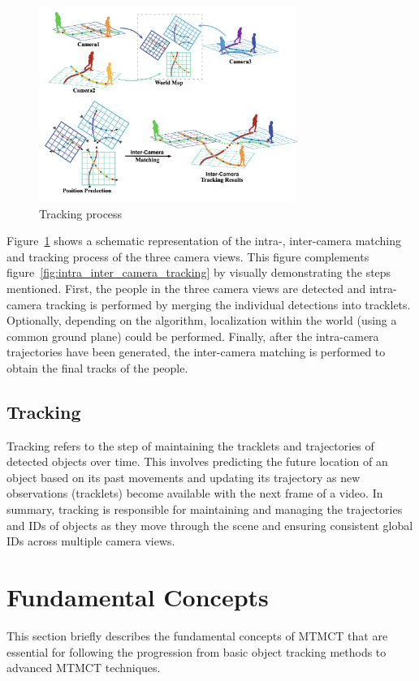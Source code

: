 \begin{figure}[ht]
    \centering
    \includegraphics[width=0.75\textwidth]{resources/fig/Ma21-tracking_process.png}
    \caption[Tracking process]{Tracking process~\cite[source image:][Fig.~1]{Ma21}}\label{fig:projection}
\end{figure}

Figure~\ref{fig:projection} shows a schematic representation of the intra-, inter-camera matching and tracking process of the three camera views. This figure complements figure~\ref{fig:intra_inter_camera_tracking} by visually demonstrating the steps mentioned. First, the people in the three camera views are detected and intra-camera tracking is performed by merging the individual detections into tracklets. Optionally, depending on the algorithm, localization within the world (using a common ground plane) could be performed. Finally, after the intra-camera trajectories have been generated, the inter-camera matching is performed to obtain the final tracks of the people.

\subsection{Tracking}\label{subsec:tracking}
Tracking refers to the step of maintaining the tracklets and trajectories of detected objects over time. This involves predicting the future location of an object based on its past movements and updating its trajectory as new observations (tracklets) become available with the next frame of a video. In summary, tracking is responsible for maintaining and managing the trajectories and IDs of objects as they move through the scene and ensuring consistent global IDs across multiple camera views.

\section{Fundamental Concepts}\label{sec:fundamental_concepts}
This section briefly describes the fundamental concepts of MTMCT that are essential for following the progression from basic object tracking methods to advanced MTMCT techniques.

